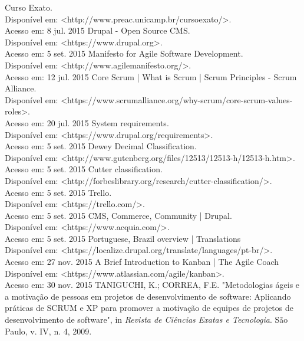 \documentclass[a4paper]{article}
\begin{document}
\pagebreak
\begin{thebibliography}{9}
 Curso Exato.\\Disponível em: <http://www.preac.unicamp.br/cursoexato/>.\\Acesso em: 8 jul. 2015
 Drupal - Open Source CMS.\\Disponível em: <https://www.drupal.org>.\\Acesso em: 5 set. 2015
 Manifesto for Agile Software Development.\\Disponível em: <http://www.agilemanifesto.org/>.\\Acesso em: 12 jul. 2015
 Core Scrum | What is Scrum | Scrum Principles - Scrum Alliance.\\ Disponível em: <https://www.scrumalliance.org/why-scrum/core-scrum-values-roles>. \\Acesso em: 20 jul. 2015
 System requirements.\\Disponível em: <https://www.drupal.org/requirements>.\\Acesso em: 5 set. 2015
 Dewey Decimal Classification.\\Disponível em: <http://www.gutenberg.org/files/12513/12513-h/12513-h.htm>.\\Acesso em: 5 set. 2015
 Cutter classification.\\Disponível em: <http://forbeslibrary.org/research/cutter-classification/>.\\Acesso em: 5 set. 2015
 Trello.\\Disponível em: <https://trello.com/>.\\Acesso em: 5 set. 2015
 CMS, Commerce, Community | Drupal.\\Disponível em: <https://www.acquia.com/>.\\Acesso em: 5 set. 2015
 Portuguese, Brazil overview | Translations\\Disponível em: <https://localize.drupal.org/translate/languages/pt-br/>.\\Acesso em: 27 nov. 2015
 A Brief Introduction to Kanban | The Agile Coach\\Disponível em: <https://www.atlassian.com/agile/kanban>.\\Acesso em: 30 nov. 2015
 TANIGUCHI, K.; CORREA, F.E. "Metodologias ágeis e a motivação de pessoas em projetos de desenvolvimento
de software: Aplicando práticas de SCRUM e XP para promover a motivação de equipes de projetos
de desenvolvimento de software", in \textit{Revista de Ciências Exatas e Tecnologia}. São Paulo, v. IV, n. 4, 2009.

\end{thebibliography}
\end{document}
